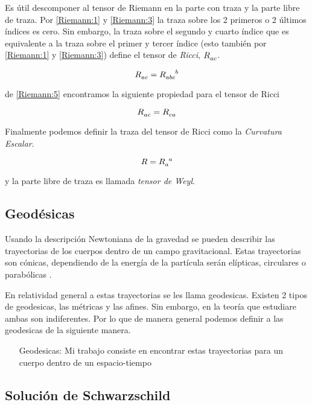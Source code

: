 \documentclass[../Main.tex]{subfiles}
\begin{document}
Es útil descomponer al tensor de Riemann en la parte con traza y la parte libre de traza. Por \eqref{Riemann:1} y \eqref{Riemann:3} la traza sobre los 2 primeros o 2 últimos índices es cero. Sin embargo, la traza sobre el segundo y cuarto índice que es equivalente a la traza sobre el primer y tercer índice (esto también por \eqref{Riemann:1} y \eqref{Riemann:3}) define el tensor de \textit{Ricci}, $\tensor{R}{_{ac}}$.

\begin{equation}
    \tensor{R}{_{ac}} = \tensor{R}{_{abc}^{b}}
\end{equation}

de \eqref{Riemann:5} encontramos la siguiente propiedad para el tensor de Ricci

\begin{equation}
    \tensor{R}{_{ac}} = \tensor{R}{_{ca}}
\end{equation}

Finalmente podemos definir la traza del tensor de Ricci como la \textit{Curvatura Escalar}.

\begin{equation}
    R = \tensor{R}{_{a}^{a}}
\end{equation}

y la parte libre de traza es llamada \textit{tensor de Weyl}.

\subsection{Geodésicas}
Usando la descripción Newtoniana de la gravedad se pueden describir las trayectorias de los cuerpos dentro de un campo gravitacional. Estas trayectorias son cónicas, dependiendo de la energía de la partícula serán elípticas, circulares o parabólicas \cite{Landau1976Mechanics}.

En relatividad general a estas trayectorias se les llama geodesicas. Existen 2 tipos de geodesicas, las métricas y las afines. Sin embargo, en la teoría que estudiare ambas son indiferentes. Por lo que de manera general podemos definir a las geodesicas de la siguiente manera.
\begin{itemize}
    \item[Geodesicas:]   
Mi trabajo consiste en encontrar estas trayectorias para un cuerpo dentro de un espacio-tiempo
\end{itemize}

\subsection{Solución de Schwarzschild}
\end{document}
